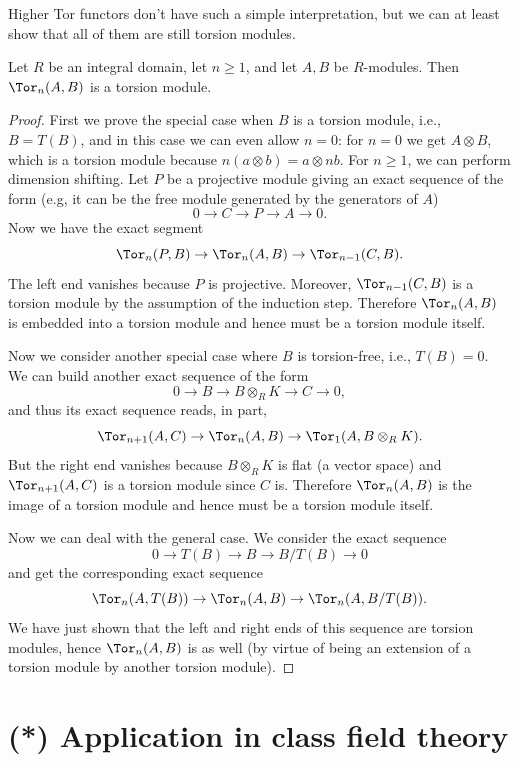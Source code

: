 Higher Tor functors don't have such a simple interpretation, but we can at least show that all of them are still torsion modules.

\begin{thm}
    Let $R$ be an integral domain, let $n\geq 1$, and let $A,B$ be $R$-modules. Then $\Tor_n(A,B)$ is a torsion module.
\end{thm}
\begin{proof}
    First we prove the special case when $B$ is a torsion module, i.e.,  $B=T(B)$, and in this case we can even allow $n=0$: for $n=0$ we get $A\otimes B$, which is a torsion module because $n(a\otimes b)=a\otimes nb$. For $n\geq 1$, we can perform dimension shifting. Let $P$ be a projective module giving an exact sequence of the form (e.g, it can be the free module generated by the generators of $A$)
    \[0\to C\to P\to A\to 0.\]
    Now we have the exact segment
    \[\Tor_n(P,B)\to \Tor_n(A,B)\to \Tor_{n-1}(C,B).\]
    The left end vanishes because $P$ is projective. Moreover, $\Tor_{n-1}(C,B)$ is a torsion module by the assumption of the induction step. Therefore $\Tor_n(A,B)$ is embedded into a torsion module and hence must be a torsion module itself.

    Now we consider another special case where $B$ is torsion-free, i.e., $T(B)=0$. We can build another exact sequence of the form
    \[0\to B\to B\otimes_R K\to C\to 0,\]
    and thus its exact sequence reads, in part,
    \[\Tor_{n+1}(A,C)\to \Tor_n(A,B)\to \Tor_1(A,B\otimes_R K).\]
    But the right end vanishes because $B\otimes_R K$ is flat (a vector space) and $\Tor_{n+1}(A,C)$ is a torsion module since $C$ is. Therefore $ \Tor_n(A,B)$ is the image of a torsion module and hence must be a torsion module itself.

    Now we can deal with the general case. We consider the exact sequence
    \[0\to T(B)\to B\to B\slash T(B)\to 0\]
    and get the corresponding exact sequence
    \[\Tor_n(A,T(B))\to \Tor_n(A,B)\to \Tor_n(A,B\slash T(B)).\]
    We have just shown that the left and right ends of this sequence are torsion modules, hence $\Tor_n(A,B)$ is as well (by virtue of being an extension of a torsion module by another torsion module).
\end{proof}




\section{(*) Application in class field theory}

